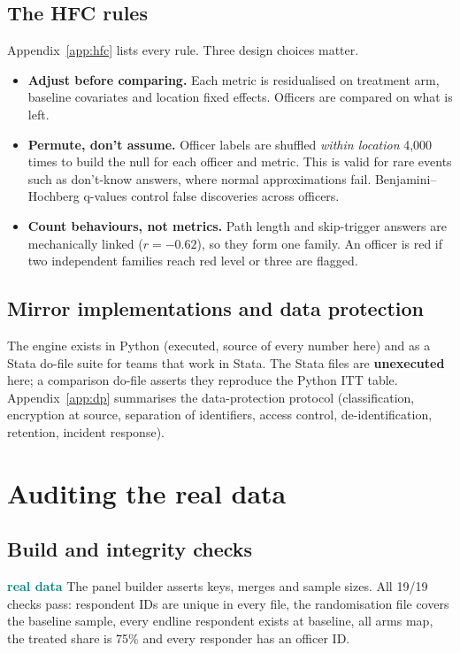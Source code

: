 \documentclass[11pt,a4paper]{article}
\newcommand{\real}{\textcolor{teal}{\sffamily\bfseries real data}}
\begin{document}
\subsection{The HFC rules}
Appendix~\ref{app:hfc} lists every rule. Three design choices matter.
\begin{itemize}
\item \textbf{Adjust before comparing.} Each metric is residualised on treatment arm, baseline covariates and location fixed effects. Officers are compared on what is left.
\item \textbf{Permute, don't assume.} Officer labels are shuffled \emph{within location} 4,000 times to build the null for each officer and metric. This is valid for rare events such as don't-know answers, where normal approximations fail. Benjamini--Hochberg q-values control false discoveries across officers.
\item \textbf{Count behaviours, not metrics.} Path length and skip-trigger answers are mechanically linked ($r=-0.62$), so they form one family. An officer is red if two independent families reach red level or three are flagged.
\end{itemize}

\subsection{Mirror implementations and data protection}
The engine exists in Python (executed, source of every number here) and as a Stata do-file suite for teams that work in Stata. The Stata files are \textbf{unexecuted} here; a comparison do-file asserts they reproduce the Python ITT table. Appendix~\ref{app:dp} summarises the data-protection protocol (classification, encryption at source, separation of identifiers, access control, de-identification, retention, incident response).

\section{Auditing the real data}\label{sec:audit}
\subsection{Build and integrity checks}
\real{} The panel builder asserts keys, merges and sample sizes. All 19/19 checks pass: respondent IDs are unique in every file, the randomisation file covers the baseline sample, every endline respondent exists at baseline, all arms map, the treated share is 75\% and every responder has an officer ID.
\end{document}

